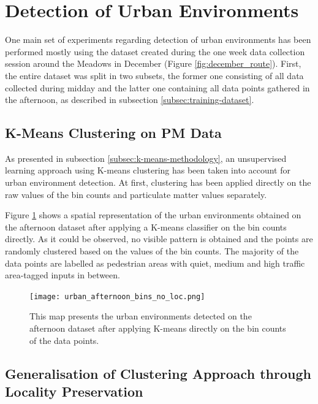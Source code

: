 \documentclass[bsc,frontabs,twoside,singlespacing,parskip,deptreport]{infthesis}     %
\begin{document}
\section{Detection of Urban Environments}

One main set of experiments regarding detection of urban environments has been performed mostly using the dataset created during the one week data collection session around the Meadows in December (Figure \ref{fig:december_route}). First, the entire dataset was split in two subsets, the former one consisting of all data collected during midday and the latter one containing all data points gathered in the afternoon, as described in subsection \ref{subsec:training-dataset}.

\subsection{K-Means Clustering on PM Data}

As presented in subsection \ref{subsec:k-means-methodology}, an unsupervised learning approach using K-means clustering has been taken into account for urban environment detection. At first, clustering has been applied directly on the raw values of the bin counts and particulate matter values separately.

Figure \ref{fig:urban_afternoon_bins_no_loc.png} shows a spatial representation of the urban environments obtained on the afternoon dataset after applying a K-means classifier on the bin counts directly. As it could be observed, no visible pattern is obtained and the points are randomly clustered based on the values of the bin counts. The majority of the data points are labelled as pedestrian areas with quiet,  medium and high traffic area-tagged inputs in between.

\begin{figure}[h!]
  \center
  \texttt{[image: urban\_afternoon\_bins\_no\_loc.png]}
  \caption{This map presents the urban environments detected on the afternoon dataset after applying K-means directly on the bin counts of the data points.}
  \label{fig:urban_afternoon_bins_no_loc.png}
\end{figure}


\subsection{Generalisation of Clustering Approach through Locality Preservation}
\label{subsec:locality-preservation-results}
\end{document}
